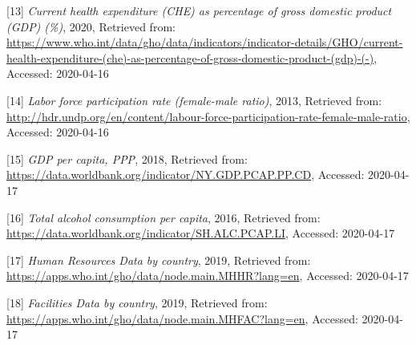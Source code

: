\documentclass[]{article}
\begin{document}
{[}13{]} \emph{Current health expenditure (CHE) as percentage of gross
domestic product (GDP) (\%)}, 2020, Retrieved from:
\url{https://www.who.int/data/gho/data/indicators/indicator-details/GHO/current-health-expenditure-(che)-as-percentage-of-gross-domestic-product-(gdp)-(-)},
Accessed: 2020-04-16

{[}14{]} \emph{Labor force participation rate (female-male ratio)},
2013, Retrieved from:
\url{http://hdr.undp.org/en/content/labour-force-participation-rate-female-male-ratio},
Accessed: 2020-04-16

{[}15{]} \emph{GDP per capita, PPP}, 2018, Retrieved from:
\url{https://data.worldbank.org/indicator/NY.GDP.PCAP.PP.CD}, Accessed:
2020-04-17

{[}16{]} \emph{Total alcohol consumption per capita}, 2016, Retrieved
from: \url{https://data.worldbank.org/indicator/SH.ALC.PCAP.LI},
Accessed: 2020-04-17

{[}17{]} \emph{Human Resources Data by country}, 2019, Retrieved from:
\url{https://apps.who.int/gho/data/node.main.MHHR?lang=en}, Accessed:
2020-04-17

{[}18{]} \emph{Facilities Data by country}, 2019, Retrieved from:
\url{https://apps.who.int/gho/data/node.main.MHFAC?lang=en}, Accessed:
2020-04-17
\end{document}
